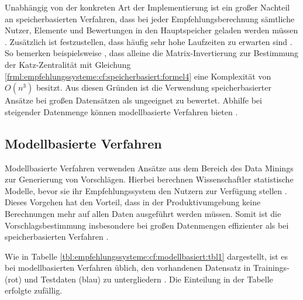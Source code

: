 Unabhängig von der konkreten Art der Implementierung ist ein großer Nachteil an speicherbasierten Verfahren, dass bei jeder Empfehlungsberechnung sämtliche Nutzer, Elemente und Bewertungen in den Hauptspeicher geladen werden müssen \cite[S. 8]{yang:2016}. Zusätzlich ist festzustellen, dass häufig sehr hohe Laufzeiten zu erwarten sind \cite[S. 2]{zhang:2010}. So bemerken beispielsweise \textcite[S. 3]{landherr:2010}, dass alleine die Matrix-Invertierung zur Bestimmung der Katz-Zentralität mit Gleichung \ref{frml:empfehlungssysteme:cf:speicherbasiert:formel4} eine Komplexität von $O(n^3)$ besitzt. Aus diesen Gründen ist die Verwendung speicherbasierter Ansätze bei großen Datensätzen als ungeeignet zu bewertet. Abhilfe bei steigender Datenmenge können modellbasierte Verfahren bieten \cite[S. 8]{yang:2016}.

\subsection{Modellbasierte Verfahren}
\label{ch:empfehlungssysteme:cf:modellbasiert}
Modellbasierte Verfahren verwenden Ansätze aus dem Bereich des Data Minings zur Generierung von Vorschlägen. Hierbei berechnen Wissenschaftler statistische Modelle, bevor sie ihr Empfehlungssystem den Nutzern zur Verfügung stellen \cite[S. 2]{cui:2020}. Dieses Vorgehen hat den Vorteil, dass in der Produktivumgebung keine Berechnungen mehr auf allen Daten ausgeführt werden müssen. Somit ist die Vorschlagsbestimmung insbesondere bei großen Datenmengen effizienter als bei speicherbasierten Verfahren \cite[S. 8]{yang:2016}.

Wie in Tabelle \ref{tbl:empfehlungssysteme:cf:modellbasiert:tbl1} dargestellt, ist es bei modellbasierten Verfahren üblich, den vorhandenen Datensatz in Trainings- (rot) und Testdaten (blau) zu untergliedern \cite[S. 71f.]{recommenderSystems:2016}. Die Einteilung in der Tabelle erfolgte zufällig.%

